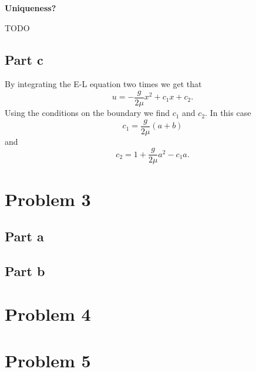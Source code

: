 \documentclass{article}
\begin{document}
\textbf{Uniqueness?}

TODO
\subsection{Part c}
By integrating the E-L equation two times we get that
\[
	u=-\frac{g}{2\mu} x^2 +c_1x+c_2.
\]
Using the conditions on the boundary we find $c_1$ and $c_2$. In this case
\[
	c_1=\frac{g}{2\mu}(a+b)
\]
and
\[
	c_2=1+\frac{g}{2\mu}a^2-c_1a.
\]
\section{Problem 3}
\subsection{Part a}
\subsection{Part b}
\section{Problem 4}
\section{Problem 5}
\end{document}
